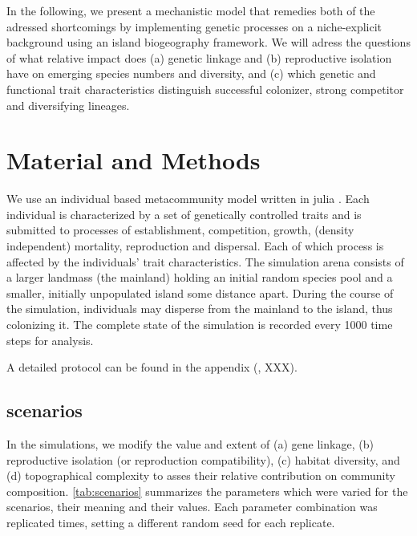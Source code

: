 \documentclass[a4paper]{scrartcl}
\begin{document}
In the following, we present a mechanistic model that remedies both of the adressed shortcomings
by implementing genetic processes on a niche-explicit background
using an island biogeography framework.%
We will adress the questions of what relative impact does (a) genetic linkage and
(b) reproductive isolation have on emerging species numbers and diversity,
and (c) which genetic and functional trait characteristics distinguish successful colonizer,
strong competitor and diversifying lineages.



\section{Material and Methods}
We use an individual based metacommunity model written in julia \cite{JULIALANG}.
Each individual is characterized by a set of genetically controlled traits and is submitted to processes of
establishment, competition, growth, (density independent) mortality, reproduction and dispersal.
Each of which process is affected by the individuals' trait characteristics.
The simulation arena consists of a larger landmass (the mainland) holding an initial random species pool and a smaller, initially unpopulated island some distance apart.
During the course of the simulation, individuals may disperse from the mainland to the island, thus colonizing it.
The complete state of the simulation is recorded every 1000 time steps for analysis.

A detailed protocol can be found in the appendix (\cite{grimm2010odd}, XXX).

\subsection{scenarios}
In the simulations, we modify the value and extent of
(a) gene linkage,
(b) reproductive isolation (or reproduction compatibility),
(c) habitat diversity, and
(d) topographical complexity
to asses their relative contribution on community composition.
\cref{tab:scenarios} summarizes the parameters which were varied for the scenarios, their meaning and their values. %
Each parameter combination was replicated %
times, setting a different random seed for each replicate.
\end{document}
